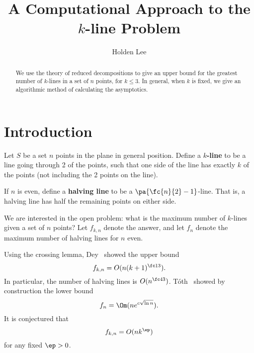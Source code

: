\documentclass[12pt, reqno]{amsart}
\newcommand{\Keywords}[1]{\par\noindent \newline
{\small{\em Keywords\/}: #1}}
\begin{document}

\title[A Computational Approach to the $k$-line Problem]
{A Computational Approach to the $k$-line Problem}
    \author{Holden Lee}

\address{Department of Mathematics, Massachusetts Institute of Technology, Cambridge, Massachusetts 02139}


\begin{abstract}
We use the theory of reduced decompositions to give an upper bound for the greatest number of $k$-lines in a set of $n$ points, for $k\le 3$. In general, when $k$ is fixed, we give an algorithmic method of calculating the asymptotics.
\end{abstract}

\maketitle

\section{Introduction}


\begin{df}
Let $S$ be a set $n$ points in the plane in general position. Define a \textbf{$k$-line} to be a line going through 2 of the points, such that one side of the line has exactly $k$ of the points (not including the 2 points on the line).

If $n$ is even, define a \textbf{halving line} to be a $\pa{\fc{n}{2}-1}$-line. That is, a halving line has half the remaining points on either side.
\end{df}

We are interested in the open problem: what is the maximum number of $k$-lines given a set of $n$ points? Let $f_{k,n}$ denote the answer, and let $f_n$ denote the maximum number of halving lines for $n$ even.

Using the crossing lemma, Dey~\cite{De98} showed the upper bound
\[
f_{k,n}=O(n(k+1)^{\fc13}).
\]
In particular, the number of halving lines is $O(n^{\fc 43})$. T\'oth~\cite{To01} showed by construction the lower bound
\[
f_n=\Om(ne^{c\sqrt{\ln n}}).
\]
It is conjectured that
\[
f_{k,n}=O(nk^{\ep})
\]
for any fixed $\ep>0$.
\end{document}
